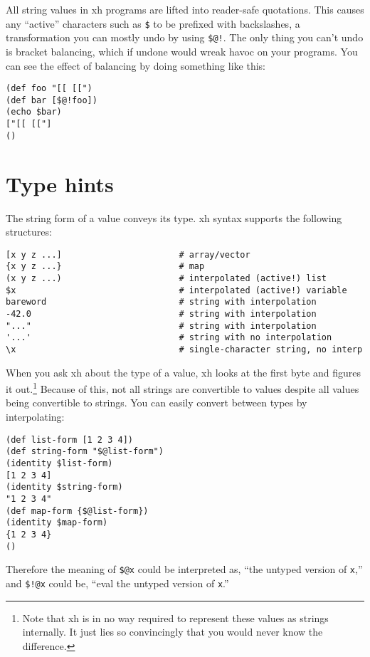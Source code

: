 \documentclass{report}
\begin{document}
  All string values in xh programs are lifted into reader-safe quotations. This
  causes any ``active'' characters such as \verb|$| to be prefixed with
  backslashes, a transformation you can mostly undo by using \verb|$@!|. The
  only thing you can't undo is bracket balancing, which if undone would wreak
  havoc on your programs. You can see the effect of balancing by doing
  something like this:

\begin{verbatim}
(def foo "[[ [[")
(def bar [$@!foo])
(echo $bar)
["[[ [["]
()
\end{verbatim}

\section{Type hints}\label{sec:type-hints}
    The string form of a value conveys its type. xh syntax supports the
    following structures:

\begin{verbatim}
[x y z ...]                       # array/vector
{x y z ...}                       # map
(x y z ...)                       # interpolated (active!) list
$x                                # interpolated (active!) variable
bareword                          # string with interpolation
-42.0                             # string with interpolation
"..."                             # string with interpolation
'...'                             # string with no interpolation
\x                                # single-character string, no interp
\end{verbatim}

    When you ask xh about the type of a value, xh looks at the first byte and
    figures it out.\footnote{Note that xh is in no way required to represent
    these values as strings internally. It just lies so convincingly that you
    would never know the difference.} Because of this, not all strings are
    convertible to values despite all values being convertible to strings. You
    can easily convert between types by interpolating:

\begin{verbatim}
(def list-form [1 2 3 4])
(def string-form "$@list-form")
(identity $list-form)
[1 2 3 4]
(identity $string-form)
"1 2 3 4"
(def map-form {$@list-form})
(identity $map-form)
{1 2 3 4}
()
\end{verbatim}

    Therefore the meaning of \verb|$@x| could be interpreted as, ``the untyped
    version of {\tt x},'' and \verb|$!@x| could be, ``eval the untyped version
    of {\tt x}.''
\end{document}
